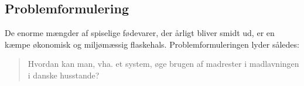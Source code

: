 \subsection{Problemformulering}
\label{subsec:problemformulering}
De enorme mængder af spiselige fødevarer, der årligt bliver smidt ud, er en kæmpe økonomisk og miljømæssig flaskehals. Problemformuleringen lyder således:

\begin{quote}
Hvordan kan man, vha. et system, øge brugen af madrester i madlavningen i danske husstande?
\end{quote} 
